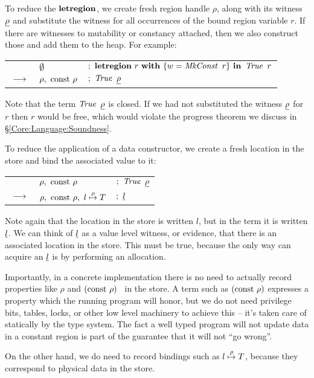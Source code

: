 To reduce the $\textrm{\textbf{letregion}}$, we create fresh region handle $\rho$, along with its witness $\underline{\rho}$ and substitute the witness for all occurrences of the bound region variable $r$. If there are witnesses to mutability or constancy attached, then we also construct those and add them to the heap. For example:

\medskip
\qq
\begin{tabular}{lll}
		& $\emptyset$			& $ ; \ \kletregion \ r \ \kwith \ \{ w = \iMkConst \ r \} \ 
								\kin \ \iTrue \ r$ \\
	$\ \textbf{$\longrightarrow$} \ $	& $\rho, \ \textrm{const} \ \rho$	& $ ; \ \iTrue \ \un{\rho}$
\end{tabular}
\medskip

Note that the term $\iTrue \ \un{\rho}$ is closed. If we had not substituted the witness $\underline{\rho}$ for $r$ then $r$ would be free, which would violate the progress theorem we discuss in \S\ref{Core:Language:Soundness}.

\clearpage{}
To reduce the application of a data constructor, we create a fresh location in the store and bind the associated value to it:

\qq
\begin{tabular}{lll}
		& $\rho, \ \textrm{const} \ \rho$		
		& $ ; \ \iTrue \ \un{\rho}$ \\
	$\ \textbf{$\longrightarrow$} \ $	& $\rho, \ \textrm{const} \ \rho, \ l \stackrel{\rho}{\mapsto} T$	
		& $ ; \ \un{l}$
\end{tabular}

Note again that the location in the store is written $l$, but in the term it is written $\underline{l}$. We can think of $\underline{l}$ as a value level witness, or evidence, that there is an associated location in the store. This must be true, because the only way can acquire an $\underline{l}$ is by performing an allocation.

Importantly, in a concrete implementation there is no need to actually record properties like $\rho$ and $(\textrm{const} \ \rho)$ \ in the store. A term such as $(\textrm{const} \ \rho)$ expresses a property which the running program will honor, but we do not need privilege bits, tables, locks, or other low level machinery to achieve this -- it's taken care of statically by the type system. The fact a well typed program will not update data in a constant region is part of the guarantee that it will not ``go wrong''.

On the other hand, we do need to record bindings such as $l \stackrel{\rho}{\mapsto} T$, because they correspond to physical data in the store.


